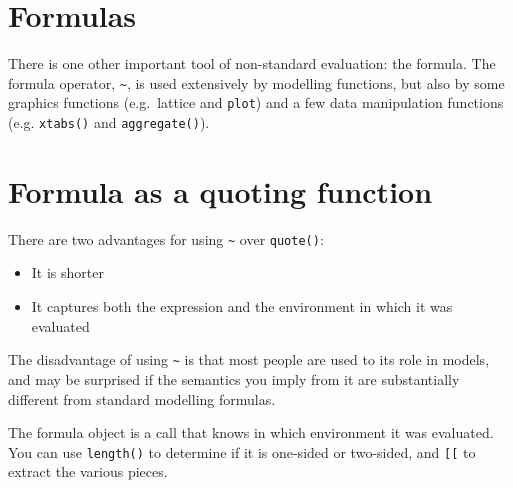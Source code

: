 \hypertarget{formulas}{%
\section{Formulas}\label{formulas}}

There is one other important tool of non-standard evaluation: the
formula. The formula operator, \texttt{\textasciitilde{}}, is used
extensively by modelling functions, but also by some graphics functions
(e.g.~lattice and \texttt{plot}) and a few data manipulation functions
(e.g. \texttt{xtabs()} and \texttt{aggregate()}).

\hypertarget{formula-as-a-quoting-function}{%
\section{Formula as a quoting
function}\label{formula-as-a-quoting-function}}

There are two advantages for using \texttt{\textasciitilde{}} over
\texttt{quote()}:

\begin{itemize}
\tightlist
\item
  It is shorter
\item
  It captures both the expression and the environment in which it was
  evaluated
\end{itemize}

The disadvantage of using \texttt{\textasciitilde{}} is that most people
are used to its role in models, and may be surprised if the semantics
you imply from it are substantially different from standard modelling
formulas.

The formula object is a call that knows in which environment it was
evaluated. You can use \texttt{length()} to determine if it is one-sided
or two-sided, and \texttt{{[}{[}} to extract the various pieces.

\begin{Shaded}
\begin{Highlighting}[]
\StringTok{ }\ErrorTok{~}\StringTok{ }\OperatorTok{+}\StringTok{ }
\NormalTok{f1[[}\NormalTok{]]}
\NormalTok{f1[[}\NormalTok{]]}

\StringTok{ }\OperatorTok{~}\StringTok{ }\OperatorTok{+}\StringTok{ }
\NormalTok{f2[[}\NormalTok{]]}
\NormalTok{f2[[}\NormalTok{]]}
\NormalTok{f2[[}\NormalTok{]]}
\end{Highlighting}
\end{Shaded}

